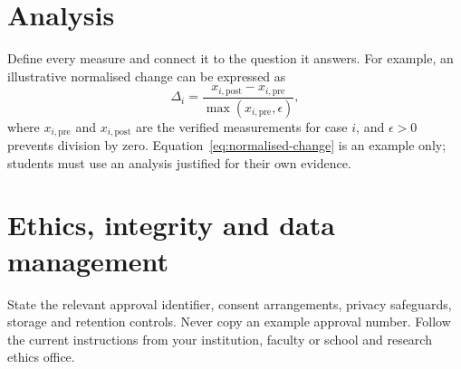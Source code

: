 \section{Analysis}
Define every measure and connect it to the question it answers. For example, an
illustrative normalised change can be expressed as
\begin{equation}
  \Delta_{i}=\frac{x_{i,\mathrm{post}}-x_{i,\mathrm{pre}}}{
  \max(x_{i,\mathrm{pre}},\epsilon)},
  \label{eq:normalised-change}
\end{equation}
where $x_{i,\mathrm{pre}}$ and $x_{i,\mathrm{post}}$ are the verified measurements for
case $i$, and $\epsilon>0$ prevents division by zero. Equation~\eqref{eq:normalised-change}
is an example only; students must use an analysis justified for their own evidence.

\section{Ethics, integrity and data management}
State the relevant approval identifier, consent arrangements, privacy safeguards,
storage and retention controls. Never copy an example approval number. Follow the
current instructions from your institution, faculty or school and research ethics
office.
